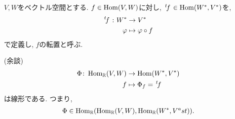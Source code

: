 \begin{definition}
  $V,W$をベクトル空間とする.
  $f\in \operatorname{Hom}(V,W)$に対し,
  $\left.^{t}\!f\right.\in \operatorname{Hom}(W^\ast,V^\ast)$を,
  \begin{align*}
    \left.^{t}\!f\right.\colon W^\ast &\to V^\ast\\
    \varphi &\mapsto \varphi\circ f
  \end{align*}
  で定義し, $f$の転置と呼ぶ.
\end{definition}

(余談)
\begin{align*}
  \Phi\colon \operatorname{Hom}_{\mathbb{R}}(V,W)&\to \operatorname{Hom}(W^\ast,V^\ast)  \\
  f&\mapsto \Phi_f=\left.^{t}\!f\right.
\end{align*}
は線形である.
つまり,
\begin{align*}
  \Phi\in\operatorname{Hom}_{\mathbb{R}}(\operatorname{Hom}_{\mathbb{R}}(V,W),\operatorname{Hom}_{\mathbb{R}}(W^\ast,V^ast)).
\end{align*}
